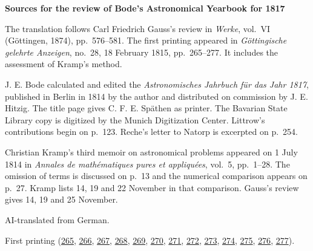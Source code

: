 \clearpage\thispagestyle{empty}
\begin{center}\Large\bfseries Sources for the review of Bode’s Astronomical Yearbook for 1817\end{center}

The translation follows Carl Friedrich Gauss’s review in \emph{Werke}, vol.~VI (Göttingen, 1874), pp.~576--581. The first printing appeared in \emph{Göttingische gelehrte Anzeigen}, no.~28, 18 February 1815, pp.~265--277. It includes the assessment of Kramp’s method.

J. E. Bode calculated and edited the \emph{Astronomisches Jahrbuch für das Jahr 1817}, published in Berlin in 1814 by the author and distributed on commission by J. E. Hitzig. The title page gives C. F. E. Späthen as printer. The Bavarian State Library copy is digitized by the Munich Digitization Center. Littrow’s contributions begin on p.~123. Reche’s letter to Natorp is excerpted on p.~254.

Christian Kramp’s third memoir on astronomical problems appeared on 1 July 1814 in \emph{Annales de mathématiques pures et appliquées}, vol.~5, pp.~1--28. The omission of terms is discussed on p.~13 and the numerical comparison appears on p.~27. Kramp lists 14, 19 and 22 November in that comparison. Gauss’s review gives 14, 19 and 25 November.

AI-translated from German.

First printing (\href{https://images.p.sub.uni-goettingen.de/iiif/image/gdz:PPN319721507_1815:00000269/full/1650,/0/default.jpg}{265}, \href{https://images.p.sub.uni-goettingen.de/iiif/image/gdz:PPN319721507_1815:00000270/full/1650,/0/default.jpg}{266}, \href{https://images.p.sub.uni-goettingen.de/iiif/image/gdz:PPN319721507_1815:00000271/full/1650,/0/default.jpg}{267}, \href{https://images.p.sub.uni-goettingen.de/iiif/image/gdz:PPN319721507_1815:00000272/full/1650,/0/default.jpg}{268}, \href{https://images.p.sub.uni-goettingen.de/iiif/image/gdz:PPN319721507_1815:00000273/full/1650,/0/default.jpg}{269}, \href{https://images.p.sub.uni-goettingen.de/iiif/image/gdz:PPN319721507_1815:00000274/full/1650,/0/default.jpg}{270}, \href{https://images.p.sub.uni-goettingen.de/iiif/image/gdz:PPN319721507_1815:00000275/full/1650,/0/default.jpg}{271}, \href{https://images.p.sub.uni-goettingen.de/iiif/image/gdz:PPN319721507_1815:00000276/full/1650,/0/default.jpg}{272}, \href{https://images.p.sub.uni-goettingen.de/iiif/image/gdz:PPN319721507_1815:00000277/full/1650,/0/default.jpg}{273}, \href{https://images.p.sub.uni-goettingen.de/iiif/image/gdz:PPN319721507_1815:00000278/full/1650,/0/default.jpg}{274}, \href{https://images.p.sub.uni-goettingen.de/iiif/image/gdz:PPN319721507_1815:00000279/full/1650,/0/default.jpg}{275}, \href{https://images.p.sub.uni-goettingen.de/iiif/image/gdz:PPN319721507_1815:00000280/full/1650,/0/default.jpg}{276}, \href{https://images.p.sub.uni-goettingen.de/iiif/image/gdz:PPN319721507_1815:00000281/full/1650,/0/default.jpg}{277}).

